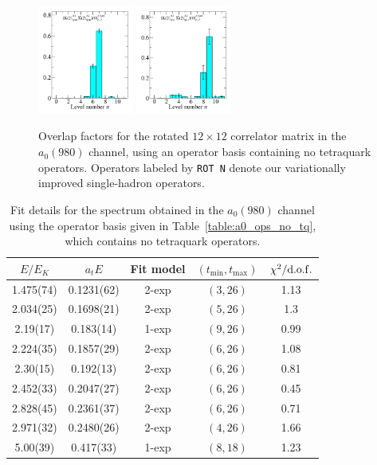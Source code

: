 \begin{figure}
  \includegraphics[width=0.28\textwidth]{figures/spectrum_a1gm/no_tq/zfactors/zfactor_isotriplet_kaon_kbar-A1gm_1-P011-A2-SS_0-P0-1-1-A2-SS_0.pdf}
  \includegraphics[width=0.28\textwidth]{figures/spectrum_a1gm/no_tq/zfactors/zfactor_isotriplet_kaon_kbar-A1gm_1-P011-A2-SS_1-P0-1-1-A2-SS_1.pdf}
  \cprotect\caption{Overlap factors for the rotated $12\times 12$ correlator matrix in the $a_0(980)$ channel, using an operator basis containing no tetraquark operators. Operators labeled by \verb+ROT N+ denote our variationally improved single-hadron operators.}
  \label{fig:a0_no_tq_zfactors}
\end{figure}

\begin{table}
  \centering
  \begin{tabular}{c|c|c|c|c}
    $E / E_K$ & $a_t E$ & Fit model & $(t_{\mathrm{min}}, {t_\mathrm{max}})$ & $\chi^2 / \rm{d.o.f.}$\\
    \hline
    1.475(74)&0.1231(62)&2{-}exp&$(3, 26)$&1.13\\
    2.034(25)&0.1698(21)&2{-}exp&$(5, 26)$&1.3\\
    2.19(17)&0.183(14)&1{-}exp&$(9, 26)$&0.99\\
    2.224(35)&0.1857(29)&2{-}exp&$(6, 26)$&1.08\\
    2.30(15)&0.192(13)&2{-}exp&$(6, 26)$&0.81\\
    2.452(33)&0.2047(27)&2{-}exp&$(6, 26)$&0.45\\
    2.828(45)&0.2361(37)&2{-}exp&$(6, 26)$&0.71\\
    2.971(32)&0.2480(26)&2{-}exp&$(4, 26)$&1.66\\
    5.00(39)&0.417(33)&1{-}exp&$(8, 18)$&1.23
  \end{tabular}
  \caption{Fit details for the spectrum obtained in the $a_0(980)$ channel using the operator basis given in Table~\ref{table:a0_ops_no_tq}, which contains no tetraquark operators.}
  \label{table:a0_no_tq_spectrum}
\end{table}


